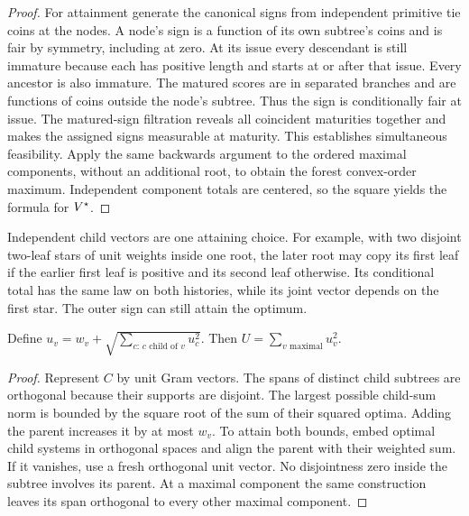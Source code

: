 \begin{proof}
For attainment generate the canonical signs from independent primitive
tie coins at the nodes. A node's sign is a function of its own subtree's
coins and is fair by symmetry, including at zero. At its issue every
descendant is still immature because each has positive length and starts
at or after that issue. Every ancestor is also immature. The matured
scores are in separated branches and are functions of coins
outside the node's subtree. Thus the sign is conditionally fair at issue. The
matured-sign filtration reveals all coincident maturities together and
makes the assigned signs measurable at maturity. This establishes
simultaneous feasibility. Apply the same backwards argument to the
ordered maximal components, without an additional root, to obtain the
forest convex-order maximum. Independent component totals are centered,
so the square yields the formula for $V^\star$.
\end{proof}

Independent child vectors are one attaining choice. For example, with
two disjoint two-leaf stars of unit weights inside one root, the later
root may copy its first leaf if the earlier first leaf is positive and
its second leaf otherwise. Its conditional total has the same law on
both histories, while its joint vector depends on the first star.
The outer sign can still attain the optimum.

\begin{proposition}\label{prop:gram}
Define $u_v=w_v+\sqrt{\sum_{c:\,c\text{ child of }v}u_c^2}$. Then
$U=\sum_{v\text{ maximal}}u_v^2$.
\end{proposition}
\begin{proof}
Represent $C$ by unit Gram vectors. The spans of distinct child
subtrees are orthogonal because their supports are disjoint. The
largest possible child-sum norm is bounded by the square root of the
sum of their squared optima. Adding the parent increases it by at most
$w_v$. To attain both bounds, embed optimal child systems in orthogonal
spaces and align the parent with their weighted sum. If it vanishes,
use a fresh orthogonal unit vector. No disjointness zero inside the
subtree involves its parent. At a maximal component the same construction
leaves its span orthogonal to every other maximal component.
\end{proof}
